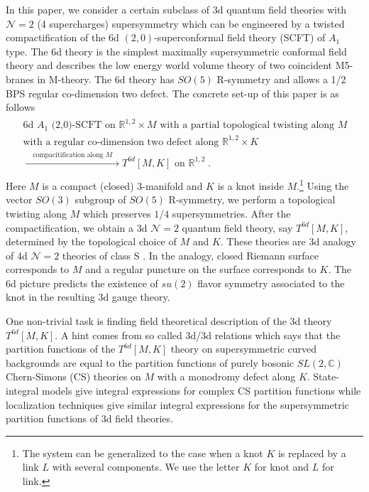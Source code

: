 \documentclass[a4paper,11pt]{article}
\begin{document}
In this paper, we consider a certain subclass of 3d  quantum field theories  with $\mathcal{N}=2$ (4 supercharges) supersymmetry which can be engineered by a twisted compactification of the 6d  $(2,0)$-superconformal field theory (SCFT) of $A_1$ type.  The  6d theory is the simplest  maximally supersymmetric conformal field theory  and describes the low energy world volume theory of two coincident M5-branes in M-theory. The 6d theory has $SO(5)$ R-symmetry and allows a 1/2 BPS regular co-dimension  two defect. The concrete set-up of this paper  is as follows
%
\begin{align}
\begin{split}
&\textrm{6d $A_1$ (2,0)-SCFT on  $\mathbb{R}^{1,2}\times M$ with a partial topological twisting along $M$ }
\\
&\textrm{with a regular co-dimension two defect along $\mathbb{R}^{1,2}\times K$} 
\\
&\xrightarrow[\text{}]{\quad \text{compacitification along $M$}\quad} T^{6d}[M,K]\textrm{  on $\mathbb{R}^{1,2}$}\;. \label{6d set-up}
\end{split}
\end{align}
%
Here $M$ is a compact (closed) 3-manifold and $K$ is a knot inside $M$.\footnote{The system can be generalized to the case when a knot $K$ is replaced by a link $L$ with several components. We  use the letter $K$ for knot and $L$ for link.} Using the vector $SO(3)$ subgroup of $SO(5)$ R-symmetry, we perform a topological twisting along $M$ which preserves $1/4$ supersymmetries.  After the  compactification, we obtain a 3d $\mathcal{N}=2$ quantum field theory, say $T^{6d}[M,K]$, determined  by  the topological choice of $M$ and  $K$. 
These theories are 3d analogy of 4d $\mathcal{N}=2$ theories of class S \cite{Gaiotto:2009we,Gaiotto:2009hg}.  In the analogy, closed Riemann surface corresponds to $M$ and a regular puncture on the surface corresponds to $K$. The 6d picture predicts the existence of  $su(2)$ flavor symmetry associated to the knot in the resulting 3d gauge theory. 

One non-trivial task is finding field theoretical description of the  3d  theory $T^{6d}[M,K]$.  A hint comes from so called 3d/3d relations  \cite{Yagi:2013fda,Cordova:2013cea,Lee:2013ida,Dimofte:2014zga,Gang:2015wya} which says that the partition functions of the  $T^{6d}[M,K]$ theory on supersymmetric curved backgrounds are equal to the partition functions of purely bosonic $SL(2,\mathbb{C})$ Chern-Simons (CS) theories on $M$ with a  monodromy defect along $K$.   
State-integral models \cite{2007JGP,Dimofte:2011gm,Andersen:2011bt,Dimofte:2012qj,Dimofte:2014zga} give integral expressions for complex CS  partition functions while
localization techniques \cite{Kim:2009wb,Kapustin:2009kz,Hama:2010av,Imamura:2011su} give similar integral expressions for the supersymmetric partition functions of 
3d field theories. 
\end{document}

